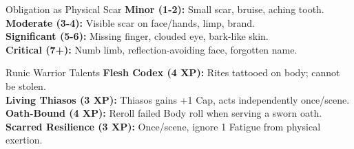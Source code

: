\documentclass[10pt]{article}
\begin{document}
\begin{minipage}[t]{0.48\linewidth}
    \vspace{0.5em}
    
    \begin{charbox}{Obligation as Physical Scar}
        \textbf{Minor (1-2):} Small scar, bruise, aching tooth.\\
        \textbf{Moderate (3-4):} Visible scar on face/hands, limp, brand.\\
        \textbf{Significant (5-6):} Missing finger, clouded eye, bark-like skin.\\
        \textbf{Critical (7+):} Numb limb, reflection-avoiding face, forgotten name.
    \end{charbox}
    
    \vspace{0.5em}
    
    \begin{charbox}{Runic Warrior Talents}
        \textbf{Flesh Codex (4 XP):} Rites tattooed on body; cannot be stolen.\\
        \textbf{Living Thiasos (3 XP):} Thiasos gains +1 Cap, acts independently once/scene.\\
        \textbf{Oath-Bound (4 XP):} Reroll failed Body roll when serving a sworn oath.\\
        \textbf{Scarred Resilience (3 XP):} Once/scene, ignore 1 Fatigue from physical exertion.
    \end{charbox}
\end{minipage}
\hfill
\end{document}
